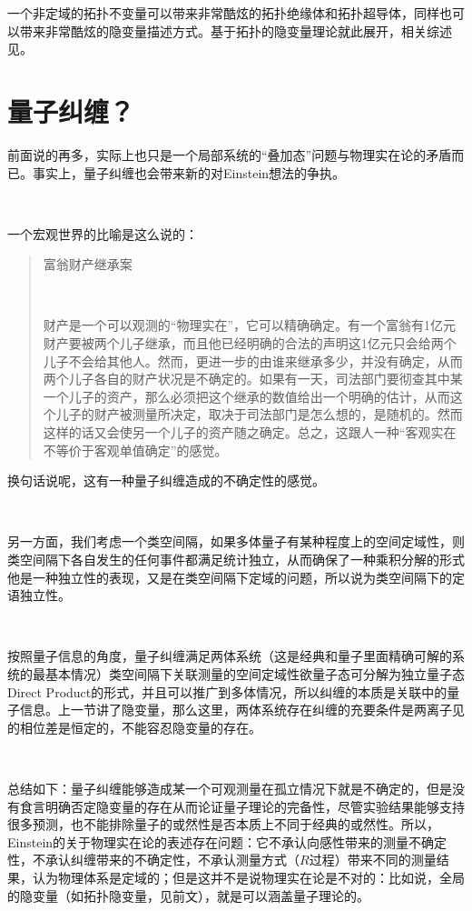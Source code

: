 \documentclass[aps,showpacs,twocolumn]{revtex4}%
\begin{document}
一个非定域的拓扑不变量可以带来非常酷炫的拓扑绝缘体和拓扑超导体，同样也可以带来非常酷炫的隐变量描述方式。基于拓扑的隐变量理论就此展开，相关综述见\cite{PhysRevE.86.046106}。

\section{量子纠缠？}

前面说的再多，实际上也只是一个局部系统的“叠加态”问题与物理实在论的矛盾而已。事实上，量子纠缠也会带来新的对Einstein想法的争执。

\ 

一个宏观世界的比喻是这么说的\cite{ZH}：

\begin{quote} 


富翁财产继承案

\ 

财产是一个可以观测的“物理实在”，它可以精确确定。有一个富翁有1亿元财产要被两个儿子继承，而且他已经明确的合法的声明这1亿元只会给两个儿子不会给其他人。然而，更进一步的由谁来继承多少，并没有确定，从而两个儿子各自的财产状况是不确定的。如果有一天，司法部门要彻查其中某一个儿子的资产，那么必须把这个继承的数值给出一个明确的估计，从而这个儿子的财产被测量所决定，取决于司法部门是怎么想的，是随机的。然而这样的话又会使另一个儿子的资产随之确定。总之，这跟人一种“客观实在不等价于客观单值确定”的感觉。
\end{quote}

换句话说呢，这有一种量子纠缠造成的不确定性的感觉。

\ 

另一方面，我们考虑一个类空间隔，如果多体量子有某种程度上的空间定域性，则类空间隔下各自发生的任何事件都满足统计独立，从而确保了一种乘积分解的形式他是一种独立性的表现，又是在类空间隔下定域的问题，所以说为类空间隔下的定语独立性。

\ 

按照量子信息的角度，量子纠缠满足两体系统（这是经典和量子里面精确可解的系统的最基本情况）类空间隔下关联测量的空间定域性欲量子态可分解为独立量子态Direct Product的形式，并且可以推广到多体情况，所以纠缠的本质是关联中的量子信息。上一节讲了隐变量，那么这里，两体系统存在纠缠的充要条件是两离子见的相位差是恒定的，不能容忍隐变量的存在。

\ 

总结如下：量子纠缠能够造成某一个可观测量在孤立情况下就是不确定的，但是没有食言明确否定隐变量的存在从而论证量子理论的完备性，尽管实验结果能够支持很多预测，也不能排除量子的或然性是否本质上不同于经典的或然性。所以，Einstein的关于物理实在论的表述存在问题：它不承认向感性带来的测量不确定性，不承认纠缠带来的不确定性，不承认测量方式（$R$过程）带来不同的测量结果，认为物理体系是定域的；但是这并不是说物理实在论是不对的：比如说，全局的隐变量（如拓扑隐变量，见前文），就是可以涵盖量子理论的。
\end{document}
